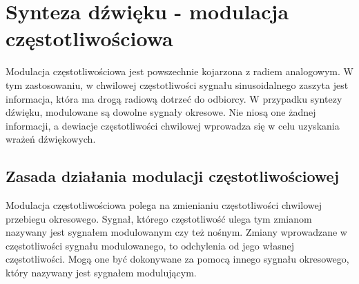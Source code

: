 \chapter{Synteza dźwięku - modulacja częstotliwościowa}\label{chapter_fm}
Modulacja częstotliwościowa jest powszechnie kojarzona z radiem analogowym. W tym zastosowaniu, w chwilowej częstotliwości sygnału sinusoidalnego zaszyta jest informacja, która ma drogą radiową dotrzeć do odbiorcy. W przypadku syntezy dźwięku, modulowane są dowolne sygnały okresowe. Nie niosą one żadnej informacji, a dewiacje częstotliwości chwilowej wprowadza się w celu uzyskania wrażeń dźwiękowych.
\section{Zasada działania modulacji częstotliwościowej}
Modulacja częstotliwościowa polega na zmienianiu częstotliwości chwilowej przebiegu okresowego. Sygnał, którego częstotliwość ulega tym zmianom nazywany jest sygnałem modulowanym czy też nośnym. Zmiany wprowadzane w częstotliwości sygnału modulowanego, to odchylenia od jego własnej częstotliwości. Mogą one być dokonywane za pomocą innego sygnału okresowego, który nazywany jest sygnałem modulującym. 
